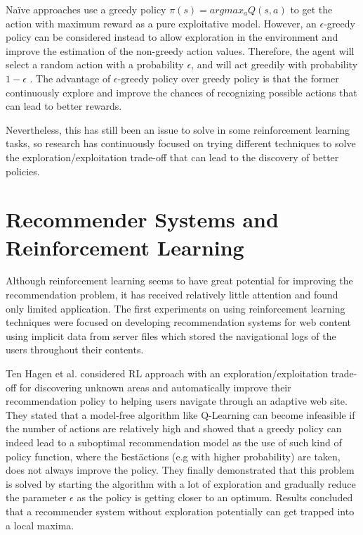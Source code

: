 Na\"{i}ve approaches use a greedy policy $\pi(s) = argmax_aQ(s, a)$ to get the action with maximum reward as a pure exploitative model. However, an $\epsilon$-greedy policy can be considered instead to allow exploration in the environment and improve the estimation of the non-greedy action values. Therefore, the agent will select a random action with a probability $\epsilon$, and will act greedily with probability $1 - \epsilon$ . The advantage of $\epsilon$-greedy policy over greedy policy is that the former continuously explore and improve the chances of recognizing possible actions that can lead to better rewards. 

Nevertheless, this has still been an issue to solve in some reinforcement learning tasks, so research has continuously focused on trying different techniques to solve the exploration/exploitation trade-off that can lead to the discovery of better policies\cite{kaelbling1996reinforcement}.

\section{Recommender Systems and Reinforcement Learning}

Although reinforcement learning seems to have great potential for improving the recommendation problem, it has received relatively little attention and found only limited application. The first experiments on using reinforcement learning techniques were focused on developing recommendation systems for web content using implicit data from server files which stored the navigational logs of the users throughout their contents. 

Ten Hagen et al. \cite{ten2003exploration} considered RL approach with an exploration/exploitation trade-off for discovering unknown areas and automatically improve their recommendation policy to helping users navigate through an adaptive web site. They stated that a model-free algorithm like Q-Learning can become infeasible if the number of actions are relatively high and showed that a greedy policy can indeed lead to a suboptimal recommendation model as the use of such kind of policy function, where the \"best\" actions (e.g with higher probability) are taken, does not always improve the policy. They finally demonstrated that this problem is solved by starting the algorithm with a lot of exploration and gradually reduce the parameter $\epsilon$ as the policy is getting closer to an optimum. Results concluded that a recommender system without exploration potentially can get trapped into a local maxima.

